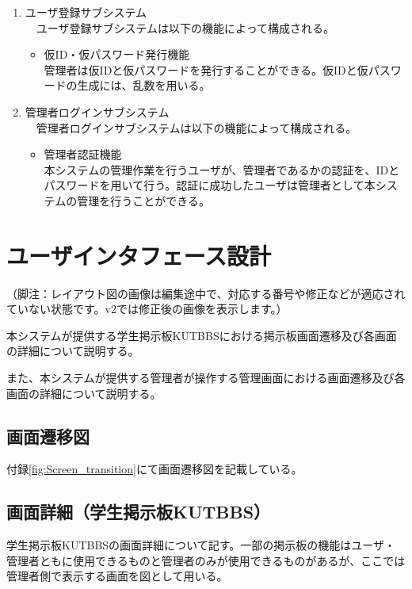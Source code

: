 \documentclass[a4j]{jarticle}
\begin{document}
\begin{enumerate}
  \item ユーザ登録サブシステム\\
  　ユーザ登録サブシステムは以下の機能によって構成される。
  \begin{itemize}
    \item 仮ID・仮パスワード発行機能\\
    管理者は仮IDと仮パスワードを発行することができる。仮IDと仮パスワードの生成には、乱数を用いる。\\
  \end{itemize}


  \item 管理者ログインサブシステム\\
  　管理者ログインサブシステムは以下の機能によって構成される。
  \begin{itemize}
    \item 管理者認証機能\\
    本システムの管理作業を行うユーザが、管理者であるかの認証を、IDとパスワードを用いて行う。認証に成功したユーザは管理者として本システムの管理を行うことができる。
  \end{itemize}

\end{enumerate}



\section{ユーザインタフェース設計}
（脚注：レイアウト図の画像は編集途中で、対応する番号や修正などが適応されていない状態です。v2では修正後の画像を表示します。）

本システムが提供する学生掲示板KUTBBSにおける掲示板画面遷移及び各画面の詳細について説明する。

また、本システムが提供する管理者が操作する管理画面における画面遷移及び各画面の詳細について説明する。

\subsection{画面遷移図}
付録\ref{fig:Screen_transition}にて画面遷移図を記載している。

\subsection{画面詳細（学生掲示板KUTBBS）}
学生掲示板KUTBBSの画面詳細について記す。一部の掲示板の機能はユーザ・管理者ともに使用できるものと管理者のみが使用できるものがあるが、ここでは管理者側で表示する画面を図として用いる。
\end{document}
